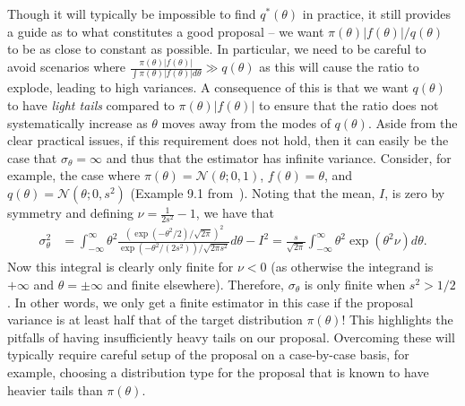 Though it will typically be impossible to find $q^*(\theta)$ in practice, it still 
provides a guide as to what constitutes a good proposal -- we want
$\pi(\theta)\left|f(\theta)\right|/q(\theta)$ to be as close to constant as possible.
In particular, we need to be careful to avoid scenarios where 
$\frac{\pi(\theta)\left|f(\theta)\right|}{\int \pi(\theta)\left|f(\theta)\right|d\theta}
\gg q(\theta)$ as this will cause the ratio to explode, leading to high variances.
A consequence of this is that we want $q(\theta)$ to have \emph{light tails}
compared to $\pi(\theta)\left|f(\theta)\right|$ to ensure that the ratio does not
systematically increase as $\theta$ moves away from the modes of $q(\theta)$.
Aside from the clear practical issues, if this requirement does not hold, then
it can easily be the case that $\sigma_{\theta}=\infty$ and thus that the estimator
has infinite variance.  Consider, for example, the case where 
$\pi(\theta) = \mathcal{N}(\theta ; 0,1)$, $f(\theta)=\theta$, and
$q(\theta) = \mathcal{N}(\theta ; 0,s^2)$ (Example 9.1 from~\cite[example 9.1]{owen2013mc}).
Noting that the mean, $I$, is zero by symmetry and defining $\nu = \frac{1}{2s^2}-1$, we have that
\begin{align}
\sigma_{\theta}^2 &= \int_{-\infty}^{\infty} \theta^2 \frac{\left(\exp\left(-\theta^2/2\right)/\sqrt{2\pi}\right)^2}
{\exp\left(-\theta^2/\left(2s^2\right)\right)/\sqrt{2\pi s^2}} d\theta
-I^2 \nonumber = \frac{s}{\sqrt{2\pi}}  \int_{-\infty}^{\infty} \theta^2 \exp \left(\theta^2 \nu\right) d\theta.
\end{align}
Now this integral is clearly only finite for $\nu < 0$ (as otherwise the integrand
is $+\infty$ and $\theta = \pm \infty$ and finite elsewhere).  Therefore, $\sigma_{\theta}$
is only finite when $s^2>1/2$.  In other words, we only get a finite estimator
in this case if the proposal variance is at least half that of the target distribution $\pi(\theta)$!
This highlights the pitfalls of having insufficiently heavy tails on our proposal.
Overcoming these will typically require careful setup of the proposal on a case-by-case basis,
for example, choosing a distribution type for the proposal that is known to have heavier tails 
than $\pi(\theta)$.

